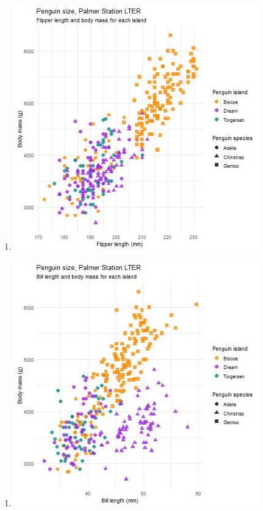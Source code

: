 \documentclass[
  letterpaper,
  DIV=11,
  numbers=noendperiod]{scrartcl}
\providecommand{\tightlist}{%
  \setlength{\itemsep}{0pt}\setlength{\parskip}{0pt}}\usepackage{longtable,booktabs,array}
\begin{document}
\begin{figure}
\begin{minipage}[b]{0.33\linewidth}
{\begin{enumerate}
\def\labelenumi{\alph{enumi})}
\tightlist
\item
  \includegraphics{Figures/myplot1.jpg}
\end{enumerate}

}

\end{minipage}%
%
\begin{minipage}[b]{0.33\linewidth}

{\centering 

\begin{enumerate}
\def\labelenumi{\alph{enumi})}
\setcounter{enumi}{1}
\tightlist
\item
  \includegraphics{Figures/myplot2.jpg}
\end{enumerate}

}
\end{minipage}
\end{figure}
\end{document}
